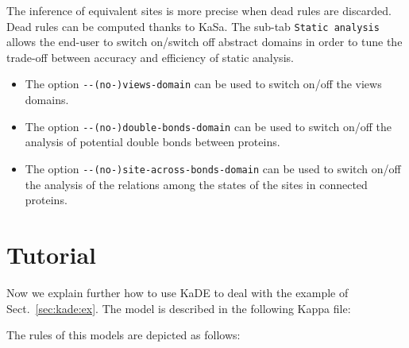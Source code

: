 \documentclass[11pt]{book}
\def\KaSa{\textsf{KaSa}}
\def\KaDE{\textsf{KaDE}}
\begin{document}
The inference of equivalent sites is more precise when dead rules are discarded. Dead rules can be computed thanks to {\KaSa}. The sub-tab \texttt{Static analysis} allows the end-user to switch on/switch off abstract domains in order to tune the trade-off between accuracy and efficiency of  static analysis.

\begin{itemize}
\item The option \verb?--(no-)views-domain? can be used to switch on/off the views domains.

\item The option \verb?--(no-)double-bonds-domain? can be used to switch on/off the analysis of potential double bonds between proteins.

\item The option \verb?--(no-)site-across-bonds-domain? can be used to switch on/off the analysis of the relations among the states of the sites in connected proteins.
\end{itemize}


\section{Tutorial}

Now we explain further how to use {\KaDE} to deal with the example of Sect.~\ref{sec:kade:ex}.
The model is described in the following Kappa file:


The rules of this models are depicted as follows:

\begin{center}
\begin{minipage}{0.49\linewidth}
    \centering{}
  \end{minipage}


\begin{minipage}{0.49\linewidth}
  \centering{}
\end{minipage}


\begin{minipage}{0.49\linewidth}
    \centering{}
  \end{minipage}

\end{center}
\end{document}
